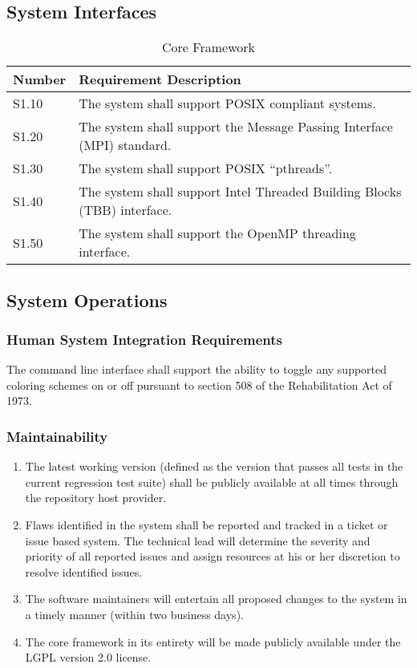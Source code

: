 \documentclass{INLreport}
\begin{document}
\clearpage

\subsection{System Interfaces}

\begin{table}[!htbp]
  \caption{Core Framework\label{tab:perf_core}}
  \begin{tabular}{|l|p{12cm}|}
    \rowcolor{gray}
    Number & Requirement Description \\ \hline
    S1.10 & The system shall support POSIX compliant systems. \\ \hline
    S1.20 & The system shall support the Message Passing Interface (MPI) standard. \\ \hline
    S1.30 & The system shall support POSIX ``pthreads''. \\ \hline
    S1.40 & The system shall support Intel Threaded Building Blocks (TBB) interface. \\ \hline
    S1.50 & The system shall support the OpenMP threading interface. \\ \hline
  \end{tabular}
\end{table}

\clearpage

\subsection{System Operations}

\subsubsection{Human System Integration Requirements}
The command line interface shall support the ability to toggle any supported coloring schemes on or off pursuant to section 508 of the Rehabilitation Act of 1973.

\subsubsection{Maintainability}
\label{Maintainability}
\begin{enumerate}
\item The latest working version (defined as the version that passes all tests in the current regression test suite)
      shall be publicly available at all times through the repository host provider.
\item Flaws identified in the system shall be reported and tracked in a ticket or issue based system. The technical lead
      will determine the severity and priority of all reported issues and assign resources at his or her discretion to
      resolve identified issues.
\item The software maintainers will entertain all proposed changes to the system in a timely manner (within two business days).
\item The core framework in its entirety will be made publicly available under the LGPL version 2.0 license.
\end{enumerate}
\end{document}

